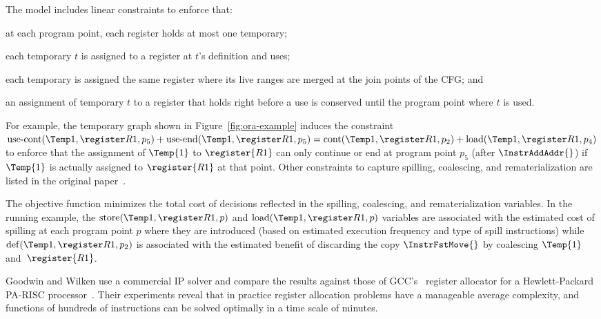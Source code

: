 \documentclass[acmsmall,authorversion,nonacm]{acmart}
\begin{document}
The model includes linear constraints to enforce that:
\begin{inparaitem}[]
\item at each program point, each register holds at most one
  temporary;
\item each temporary $t$ is assigned to a register at $t$'s definition
  and uses;
\item each temporary is assigned the same register where its live
  ranges are merged at the join points of the CFG; and
\item an assignment of temporary $t$ to a register that holds right
  before a use is conserved until the program point where $t$ is used.
\end{inparaitem}
For example, the temporary graph shown in Figure~\ref{fig:ora-example}
induces the constraint $\usecontvar{p_5} + \useendvar{p_5} =
\contvar{p_2} + \loadvar{p_4}$ to enforce that the assignment of
  $\Temp{1}$ to $\register{R1}$ can only continue or end at program
  point $p_5$ (after $\InstrAddAddr{}$) if $\Temp{1}$ is actually
  assigned to $\register{R1}$ at that point.
Other constraints to capture spilling, coalescing, and
rematerialization are listed in the original paper~\cite{Goodwin1996}.

The objective function minimizes the total cost of decisions reflected
in the spilling, coalescing, and rematerialization variables.
In the running example, the $\storevar{p}$ and $\loadvar{p}$ variables
are associated with the estimated cost of spilling at each program
point $p$ where they are introduced (based on estimated execution
frequency and type of spill instructions) while $\defvar{p_2}$ is
associated with the estimated benefit of discarding the copy
$\InstrFstMove{}$ by coalescing $\Temp{1}$ and~$\register{R1}$.

Goodwin and Wilken use a commercial IP solver and compare the results
against those of GCC's~\cite{GCC2017} register allocator for a
Hewlett-Packard PA-RISC processor~\cite{Kane1996}.
Their experiments reveal that in practice register allocation problems
have a manageable average complexity, and functions of hundreds of
instructions can be solved optimally in a time scale of minutes.
\end{document}
